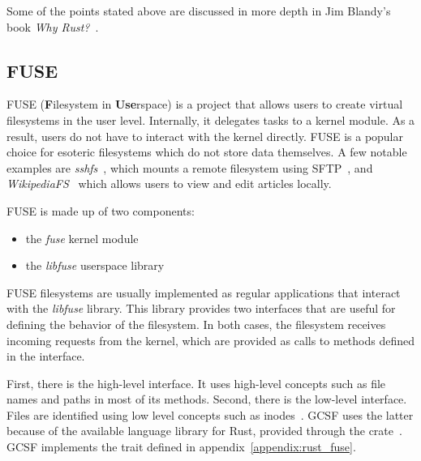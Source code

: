 Some of the points stated above are discussed in more depth in Jim Blandy's book \emph{Why Rust?}~\cite{why_rust}.

\subsection{FUSE}

FUSE (\textbf{F}ilesystem in \textbf{Use}rspace) is a project that allows users to create virtual filesystems in the user level. Internally, it delegates tasks to a kernel module. As a result, users do not have to interact with the kernel directly. FUSE is a popular choice for esoteric filesystems which do not store data themselves. A few notable examples are \emph{sshfs}~\cite{sshfs}, which mounts a remote filesystem using SFTP~\cite{sftp}, and \emph{WikipediaFS}~\cite{wikipediafs} which allows users to view and edit articles locally.

FUSE is made up of two components:
\begin{itemize}
  \itemsep0em
  \item the \textit{fuse} kernel module
  \item the \textit{libfuse} userspace library
\end{itemize}

FUSE filesystems are usually implemented as regular applications that interact with the \textit{libfuse} library. This library provides two interfaces that are useful for defining the behavior of the filesystem. In both cases, the filesystem receives incoming requests from the kernel, which are provided as calls to methods defined in the interface.

First, there is the high-level interface. It uses high-level concepts such as file names and paths in most of its methods. Second, there is the low-level interface. Files are identified using low level concepts such as inodes~\cite{tanenbaum}. GCSF uses the latter because of the available language library for Rust, provided through the  crate~\cite{fuse_crate}. GCSF implements the  trait defined in appendix~\ref{appendix:rust_fuse}.

